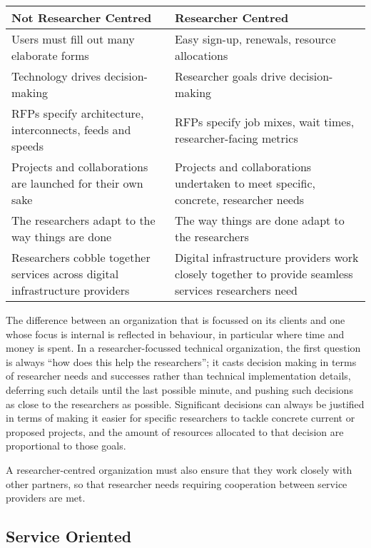 \documentclass[11pt, letterpaper, twoside]{article}
\begin{document}
\begin{table}[ht]
\centering
\small {\sffamily
{}
\begin{tabular}{P{2.5in}|P{2.5in}}
\textcolor{cdaRed}{\textbf{Not Researcher Centred}} & \textcolor{cdaRed}{\textbf{Researcher Centred}} \\
\hline \hline
Users must fill out many elaborate forms & Easy sign-up, renewals, resource allocations\\
Technology drives decision-making & Researcher goals drive decision-making\\
RFPs specify architecture, interconnects, feeds and speeds & RFPs specify job mixes, wait times, researcher-facing metrics \\
Projects and collaborations are launched for their own sake & Projects and collaborations undertaken to meet specific, concrete, researcher needs\\ 
The researchers adapt to the way things are done & The way things are done adapt to the researchers\\
Researchers cobble together services across digital infrastructure providers & Digital infrastructure providers work closely together to provide seamless services researchers need \\
\hline
\end{tabular}
}
\end{table}

The difference between an organization that is focussed on its clients
and one whose focus is internal is reflected in behaviour, in particular
where time and money is spent. In a researcher-focussed technical
organization, the first question is always ``how does this help the
researchers''; it casts decision making in terms of researcher needs and
successes rather than technical implementation details, deferring such
details until the last possible minute, and pushing such decisions as
close to the researchers as possible.  Significant decisions can always
be justified in terms of making it easier for specific researchers to
tackle concrete current or proposed projects, and the amount of
resources allocated to that decision are proportional to those goals.

A researcher-centred organization must also ensure that they work
closely with other partners, so that researcher needs requiring
cooperation between service providers are met.

\subsection*{Service Oriented}
%
\end{document}
